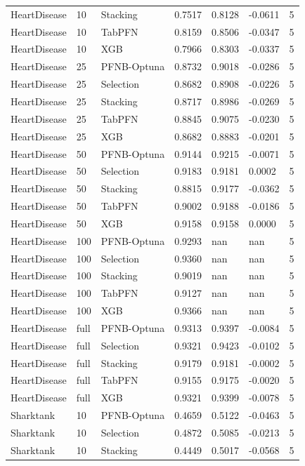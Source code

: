 \begin{tabular}{llllllr}
HeartDisease & 10 & Stacking & 0.7517 & 0.8128 & -0.0611 & 5 \\
HeartDisease & 10 & TabPFN & 0.8159 & 0.8506 & -0.0347 & 5 \\
HeartDisease & 10 & XGB & 0.7966 & 0.8303 & -0.0337 & 5 \\
HeartDisease & 25 & PFNB-Optuna & 0.8732 & 0.9018 & -0.0286 & 5 \\
HeartDisease & 25 & Selection & 0.8682 & 0.8908 & -0.0226 & 5 \\
HeartDisease & 25 & Stacking & 0.8717 & 0.8986 & -0.0269 & 5 \\
HeartDisease & 25 & TabPFN & 0.8845 & 0.9075 & -0.0230 & 5 \\
HeartDisease & 25 & XGB & 0.8682 & 0.8883 & -0.0201 & 5 \\
HeartDisease & 50 & PFNB-Optuna & 0.9144 & 0.9215 & -0.0071 & 5 \\
HeartDisease & 50 & Selection & 0.9183 & 0.9181 & 0.0002 & 5 \\
HeartDisease & 50 & Stacking & 0.8815 & 0.9177 & -0.0362 & 5 \\
HeartDisease & 50 & TabPFN & 0.9002 & 0.9188 & -0.0186 & 5 \\
HeartDisease & 50 & XGB & 0.9158 & 0.9158 & 0.0000 & 5 \\
HeartDisease & 100 & PFNB-Optuna & 0.9293 & nan & nan & 5 \\
HeartDisease & 100 & Selection & 0.9360 & nan & nan & 5 \\
HeartDisease & 100 & Stacking & 0.9019 & nan & nan & 5 \\
HeartDisease & 100 & TabPFN & 0.9127 & nan & nan & 5 \\
HeartDisease & 100 & XGB & 0.9366 & nan & nan & 5 \\
HeartDisease & full & PFNB-Optuna & 0.9313 & 0.9397 & -0.0084 & 5 \\
HeartDisease & full & Selection & 0.9321 & 0.9423 & -0.0102 & 5 \\
HeartDisease & full & Stacking & 0.9179 & 0.9181 & -0.0002 & 5 \\
HeartDisease & full & TabPFN & 0.9155 & 0.9175 & -0.0020 & 5 \\
HeartDisease & full & XGB & 0.9321 & 0.9399 & -0.0078 & 5 \\
Sharktank & 10 & PFNB-Optuna & 0.4659 & 0.5122 & -0.0463 & 5 \\
Sharktank & 10 & Selection & 0.4872 & 0.5085 & -0.0213 & 5 \\
Sharktank & 10 & Stacking & 0.4449 & 0.5017 & -0.0568 & 5 \\

\end{tabular}
